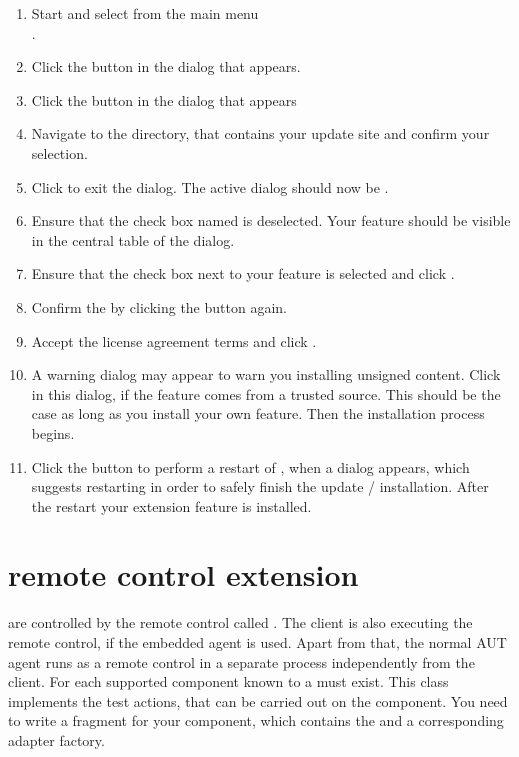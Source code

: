 \begin{enumerate}
\item Start \app{} and select from the main menu\\
.
\item Click the 
button in the  dialog that appears.
\item Click the  button in the  dialog
that appears
\item Navigate to the directory, that contains your update site and confirm your
selection.
\item Click  to exit the  dialog.
 The active dialog should now be .
\item Ensure that the check box named  is
deselected. Your feature should be visible in the central table of the dialog.
\item Ensure that the check box next to your feature is selected and click
 .
\item Confirm the  by clicking the 
 button again.
\item Accept the license agreement terms and click .
\item A warning dialog may appear to warn you installing unsigned content.
 Click  in this dialog, if the feature comes from a trusted
 source. This should be the case as long as you install your own feature.
 Then the installation process begins.
\item Click the  button to perform a restart of \app{},
 when a dialog appears, which suggests restarting \app{} in order to safely
 finish the update / installation.  After the restart your \app{} extension
 feature is installed.
\end{enumerate}

\section{\app{} remote control extension}
\label{serverExtension}

\gdauts{} are controlled by the remote control called \gdagent. The \app{}
client is also executing the \app{} remote control, if the embedded agent is
used. Apart from that, the normal AUT agent runs as a remote control in a
separate process independently from the \app{} client.
For each supported component known to \app{} a \gdtesterclass must exist.
This class implements the test actions, that can be carried out on the component.
You need to write a fragment for your component, which contains the
\gdtesterclass and a corresponding adapter factory.

